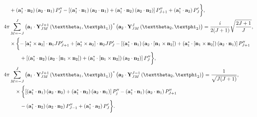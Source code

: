 \begin{enumerate}[label=(\alph*)]
\begin{fleqn}
\begin{subequations}
\begin{align}
& +\left(\vect{a}_{1}^{*} \cdot \vect{n}_{2}\right)\left(\vect{a}_{2} \cdot \vect{n}_{1}\right) P_{J}^{\prime \prime}-\left[\left(\vect{a}_{1}^{*} \cdot \vect{n}_{1}\right)\left(\vect{a}_{2} \cdot \vect{n}_{1}\right)+\left(\vect{a}_{1}^{*} \cdot \vect{n}_{2}\right)\left(\vect{a}_{2} \cdot \vect{n}_{2}\right)\right] P_{J+1}^{\prime \prime}+\left(\vect{a}_{1}^{*} \cdot \vect{a}_{2}\right) P_{J}^{\prime}\biggr\},\\
 4 \pi &\sum_{M=-J}^{J}\left(\vect{a}_{1} \cdot \vect{Y}_{J M}^{J+1}\left(\vartheta_{1}, \varphi_{1}\right)\right)^{*}\left(\vect{a}_{2} \cdot \vect{Y}_{J M}^{J}\left(\vartheta_{2}, \varphi_{2}\right)\right)=\frac{i}{2(J+1)} \sqrt{\frac{2 J+1}{J}}, \notag\\
&  \times\biggl\{-\left[\vect{a}_{1}^{*} \times \vect{a}_{2}\right] \cdot \vect{n}_{1} J P_{J+1}^{\prime}+\left[\vect{a}_{1}^{*} \times \vect{a}_{2}\right] \cdot \vect{n}_{2} J P_{J}^{\prime}-\left[\left(\vect{a}_{1}^{*} \cdot \vect{n}_{1}\right)\left(\vect{a}_{2} \cdot\left[\vect{n}_{1} \times \vect{n}_{2}\right]\right)+\left(\vect{a}_{1}^{*} \cdot\left[\vect{n}_{1} \times \vect{n}_{2}\right]\right)\left(\vect{a}_{2} \cdot \vect{n}_{1}\right)\right] P_{J+1}^{\prime \prime} \notag\\
& \qquad+\left[\left(\vect{a}_{1}^{*} \cdot \vect{n}_{2}\right)\left(\vect{a}_{2} \cdot\left[\vect{n}_{1} \times \vect{n}_{2}\right]\right)+\left(\vect{a}_{1}^{*} \cdot\left[\vect{n}_{1} \times \vect{n}_{2}\right]\right)\left(\vect{a}_{2} \cdot \vect{n}_{2}\right)\right] P_{J}^{\prime \prime}\biggr\}, \\
 4 \pi& \sum_{M=-J}^{J}\left(\vect{a}_{1} \cdot \vect{Y}_{J M}^{J+1}\left(\vartheta_{1}, \varphi_{1}\right)\right)^{*}\left(\vect{a}_{2} \cdot \vect{Y}_{J M}^{J-1}\left(\vartheta_{2}, \varphi_{2}\right)\right)=\frac{1}{\sqrt{J(J+1)}}, \notag\\
& \quad \times\biggl\{\left[\left(\vect{a}_{1}^{*} \cdot \vect{n}_{1}\right)\left(\vect{a}_{2} \cdot \vect{n}_{2}\right)+\left(\vect{a}_{1}^{*} \cdot \vect{n}_{2}\right)\left(\vect{a}_{2} \cdot \vect{n}_{1}\right)\right] P_{j}^{\prime \prime}-\left(\vect{a}_{1}^{*} \cdot \vect{n}_{1}\right)\left(\vect{a}_{2} \cdot \vect{n}_{1}\right) P_{J+1}^{\prime \prime} \notag\\
& \qquad-\left(\vect{a}_{1}^{*} \cdot \vect{n}_{2}\right)\left(\vect{a}_{2} \cdot \vect{n}_{2}\right) P_{J-1}^{\prime \prime}+\left(\vect{a}_{1}^{*} \cdot \vect{a}_{2}\right) P_{J}^{\prime}\biggr\}. 
\end{align}\label{eq:7:3:106}
\end{subequations}

\end{fleqn}
\end{enumerate}
